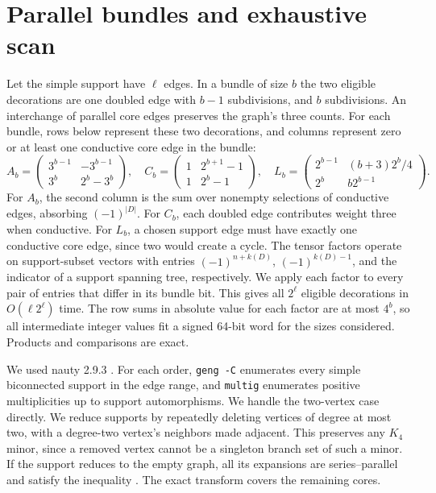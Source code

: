 \documentclass[11pt]{article}
\begin{document}
\section{Parallel bundles and exhaustive scan}
Let the simple support have \(\ell\) edges. In a bundle of size \(b\)
the two eligible decorations are one doubled edge with \(b-1\)
subdivisions, and \(b\) subdivisions. An interchange of parallel
core edges preserves the graph's three counts. For each bundle,
rows below represent these two decorations, and columns represent
zero or at least one conductive core edge in the bundle:
\[
 A_b=\begin{pmatrix}3^{b-1}&-3^{b-1}\\3^b&2^b-3^b\end{pmatrix},\quad
 C_b=\begin{pmatrix}1&2^{b+1}-1\\1&2^b-1\end{pmatrix},\quad
 L_b=\begin{pmatrix}2^{b-1}&(b+3)2^b/4\\2^b&b2^{b-1}\end{pmatrix}.
\]
For \(A_b\), the second column is the sum over nonempty selections
of conductive edges, absorbing \((-1)^{|D|}\). For \(C_b\),
each doubled edge contributes weight three when conductive.
For \(L_b\), a chosen support edge must have exactly one conductive
core edge, since two would create a cycle. The tensor factors
operate on support-subset vectors with entries
\((-1)^{n+k(D)}\), \((-1)^{k(D)-1}\), and the indicator of a support
spanning tree, respectively. We apply each factor to every pair
of entries that differ in its bundle bit. This gives all
\(2^\ell\) eligible decorations in \(O(\ell 2^\ell)\) time.
The row sums in absolute value for each factor are at most
\(4^b\), so all intermediate integer values fit a signed 64-bit
word for the sizes considered. Products and comparisons are
exact.

We used nauty 2.9.3 \cite{nauty}. For each order, \texttt{geng -C}
enumerates every simple biconnected support in the edge range,
and \texttt{multig} enumerates positive multiplicities up to
support automorphisms. We handle the two-vertex case directly.
We reduce supports by repeatedly deleting vertices of degree
at most two, with a degree-two vertex's neighbors made adjacent.
This preserves any \(K_4\) minor, since a removed vertex cannot
be a singleton branch set of such a minor. If the support reduces
to the empty graph, all its expansions are series--parallel
and satisfy the inequality \cite{noble}. The exact transform
covers the remaining cores.
\end{document}
